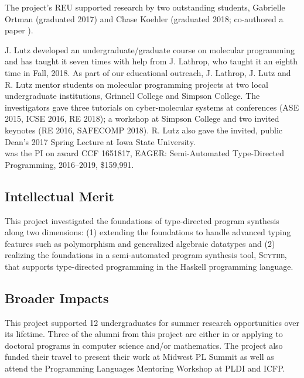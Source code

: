 The project's REU supported research by two outstanding students, Gabrielle Ortman (graduated 2017)  and Chase Koehler (graduated 2018; co-authored a paper \cite{cKMHL18}).

J. Lutz developed  an undergraduate/graduate course on molecular programming and has taught it seven times with help from J. Lathrop, who taught it an eighth time in Fall, 2018.  As part of our educational outreach, J. Lathrop, J. Lutz and R. Lutz mentor students on molecular programming projects at two local undergraduate institutions, Grinnell College and Simpson College.
The investigators gave three tutorials on cyber-molecular systems at conferences (ASE 2015, ICSE 2016, RE 2018); a workshop at Simpson College and two invited keynotes (RE 2016, SAFECOMP 2018).
R. Lutz also gave the invited, public Dean's 2017 Spring Lecture at Iowa State University. \\

 was the PI on award CCF 1651817, EAGER: Semi-Automated Type-Directed Programming, 2016--2019, \$159,991.
%
\subsection*{Intellectual Merit}
This project investigated the foundations of type-directed program synthesis along two dimensions: (1) extending the foundations to handle advanced typing features such as polymorphism and generalized algebraic datatypes and (2) realizing the foundations in a semi-automated program synthesis tool, \textsc{Scythe}, that supports type-directed programming in the Haskell programming language.

\subsection*{Broader Impacts}
This project supported 12 undergraduates for summer research opportunities over its lifetime.
Three of the alumni from this project are either in or applying to doctoral programs in computer science and/or mathematics.
The project also funded their travel to present their work at Midwest PL Summit as well as attend the Programming Languages Mentoring Workshop at PLDI and ICFP.

